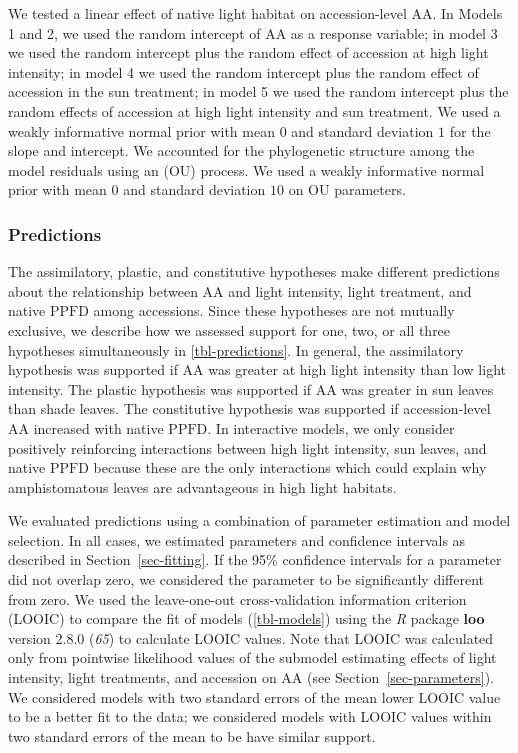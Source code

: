 \documentclass[
  letterpaper,
  DIV=11,
  numbers=noendperiod]{scrartcl}
\newcommand{\aax}{$\mathrm{AA}$}
\newcommand{\ppfd}{$\mathrm{PPFD}$}
\begin{document}
We tested a linear effect of native light habitat on accession-level
\aax. In Models 1 and 2, we used the random intercept of \aax{} as a
response variable; in model 3 we used the random intercept plus the
random effect of accession at high light intensity; in model 4 we used
the random intercept plus the random effect of accession in the sun
treatment; in model 5 we used the random intercept plus the random
effects of accession at high light intensity and sun treatment. We used
a weakly informative normal prior with mean \(0\) and standard deviation
\(1\) for the slope and intercept. We accounted for the phylogenetic
structure among the model residuals using an (OU) process. We used a
weakly informative normal prior with mean \(0\) and standard deviation
\(10\) on OU parameters.

\subsubsection{Predictions}\label{sec-predictions}

The assimilatory, plastic, and constitutive hypotheses make different
predictions about the relationship between \aax{} and light intensity,
light treatment, and native \ppfd{} among accessions. Since these
hypotheses are not mutually exclusive, we describe how we assessed
support for one, two, or all three hypotheses simultaneously in
\autoref{tbl-predictions}. In general, the assimilatory hypothesis was
supported if \aax{} was greater at high light intensity than low light
intensity. The plastic hypothesis was supported if \aax{} was greater in
sun leaves than shade leaves. The constitutive hypothesis was supported
if accession-level \aax{} increased with native \ppfd. In interactive
models, we only consider positively reinforcing interactions between
high light intensity, sun leaves, and native \ppfd{} because these are
the only interactions which could explain why amphistomatous leaves are
advantageous in high light habitats.

We evaluated predictions using a combination of parameter estimation and
model selection. In all cases, we estimated parameters and confidence
intervals as described in Section~\ref{sec-fitting}. If the 95\%
confidence intervals for a parameter did not overlap zero, we considered
the parameter to be significantly different from zero. We used the
leave-one-out cross-validation information criterion (LOOIC) to compare
the fit of models (\autoref{tbl-models}) using the \emph{R} package
\textbf{loo} version 2.8.0 (\emph{65}) to calculate LOOIC values. Note
that LOOIC was calculated only from pointwise likelihood values of the
submodel estimating effects of light intensity, light treatments, and
accession on \aax{} (see Section~\ref{sec-parameters}). We considered
models with two standard errors of the mean lower LOOIC value to be a
better fit to the data; we considered models with LOOIC values within
two standard errors of the mean to be have similar support.
\end{document}

